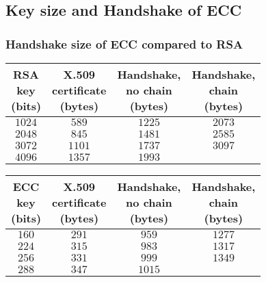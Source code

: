 \documentclass{beamer}
\begin{document}
\subsection{Key size and Handshake of ECC}
\begin{frame}
	\frametitle{Handshake size of ECC compared to RSA}
	\begin{center}
		\begin{tabular}{|c|c|c|c|}
			\hline
			\thead{RSA \\key \\(bits)}& \thead{X.509 \\certificate \\(bytes)} & \thead{Handshake,\\ no chain \\(bytes)}& \thead{Handshake, \\chain \\(bytes)} \\ \hline
			$1024$ & $ 589 $ & $ 1225 $ & $ 2073 $ \\ \hline  
			$2048$ & $ 845 $ & $ 1481 $ & $ 2585 $ \\ \hline  
			$3072$ & $ 1101 $ & $ 1737 $ & $ 3097 $ \\ \hline  
			$4096$ & $ 1357 $ & $ 1993 $ &  \\ \hline
		\end{tabular} 
		\begin{tabular}{|c|c|c|c|}
			\hline
			\thead{ECC \\key \\(bits)}& \thead{X.509 \\certificate \\(bytes)} & \thead{Handshake,\\ no chain \\(bytes)}& \thead{Handshake, \\chain \\(bytes)} \\ \hline
			$160$ & $ 291 $ & $ 959 $ & $ 1277 $ \\ \hline  
			$224$ & $ 315 $ & $ 983 $ & $ 1317 $ \\ \hline  
			$256$ & $ 331 $ & $ 999 $ & $ 1349 $ \\ \hline  
			$288$ & $ 347 $ & $ 1015 $ &  \\ \hline
		\end{tabular} 
	\end{center}
	
\end{frame}
\end{document}
